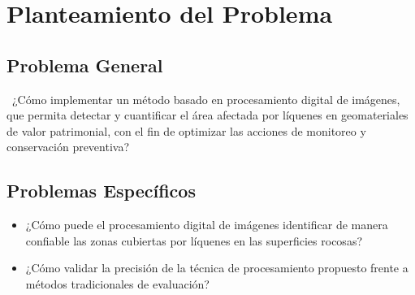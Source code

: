 \chapter{Planteamiento del Problema}


\section{Problema General}\
¿Cómo implementar un método basado en procesamiento digital de imágenes, que permita detectar y cuantificar el área afectada por líquenes en geomateriales de valor patrimonial, con el fin de optimizar las acciones de monitoreo y conservación preventiva?

\section{Problemas Específicos}

\begin{itemize}
	\item ¿Cómo puede el procesamiento digital de imágenes identificar de manera confiable las zonas cubiertas por líquenes en las superficies rocosas?
	\item ¿Cómo validar la precisión de la técnica de procesamiento propuesto frente a métodos tradicionales de evaluación?	
\end{itemize}